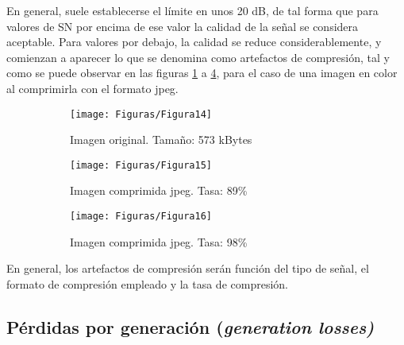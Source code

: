 \documentclass[es,practica]{uah}
\begin{document}
En general, suele establecerse el límite en unos 20 dB, de tal forma que para valores de SN por encima de ese valor la calidad de la señal se considera aceptable. Para valores por debajo, la calidad se reduce considerablemente, y comienzan a aparecer lo que se denomina como artefactos de compresión, tal y como se puede observar en las figuras \ref{fig:fig14} a \ref{fig:fig16}, para el caso de una imagen en color al comprimirla con el formato jpeg.


\begin{figure}[h!]
	\centering
	\begin{subfigure}
	  \centering
	  \texttt{[image: Figuras/Figura14]}
	  \caption{Imagen original. Tamaño: 573 kBytes}
	  \label{fig:fig14}
	\end{subfigure}
	\begin{subfigure}
	  \centering
	  \texttt{[image: Figuras/Figura15]}
	  \caption{Imagen comprimida jpeg. Tasa: 89\%}
	  \label{fig:fig15}
	\end{subfigure}
	\begin{subfigure}
		\centering
		\texttt{[image: Figuras/Figura16]}
		\caption{Imagen comprimida jpeg. Tasa: 98\%}
		\label{fig:fig16}
	  \end{subfigure}
	\caption{}
	\end{figure}


En general, los artefactos de compresión serán función del tipo de señal, el formato de compresión empleado y la tasa de compresión.

\subsection{Pérdidas por generación (\emph{generation losses)}}
\end{document}
